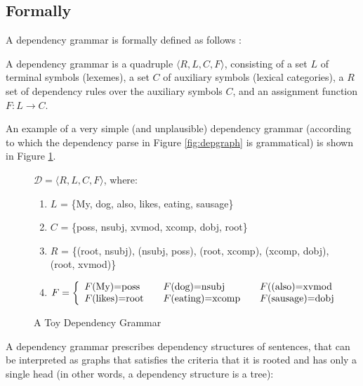 \documentclass{report}
\begin{document}
\subsection{Formally}

A dependency grammar is formally defined as follows \citep{hays1964dependency,gaifman1965dependency}:

\begin{definition}\label{def:depgram}
A dependency grammar is a quadruple $\langle R,L,C,F\rangle$, consisting of a set $L$ of terminal symbols (lexemes), a set $C$ of auxiliary symbols (lexical categories), a $R$ set of dependency rules over the auxiliary symbols $C$, and an assignment function $F : L\rightarrow C$.
\end{definition}

An example of a very simple (and unplausible) dependency grammar (according to which the dependency parse in Figure \ref{fig:depgraph} is grammatical) is shown in Figure \ref{fig:depgrammar}.

\begin{figure}[!ht]
\begin{framed}
$\mathcal{D} = \langle R,L,C,F\rangle$, where:\begin{enumerate}
\item[] $L$ = \{My, dog, also, likes, eating, sausage\}
\item[] $C$ = \{poss, nsubj, xvmod, xcomp, dobj, root\}
\item[] $R$ = \{(root, nsubj), (nsubj, poss), (root, xcomp), (xcomp, dobj), (root, xvmod)\}
\item[] $F = \left\{
  \begin{array}{l l l}
	F\text{(My)=poss} & \quad F\text{(dog)=nsubj} & \quad F(\text{(also)=xvmod}\\
	F\text{(likes)=root}& \quad F\text{(eating)=xcomp} & \quad F\text{(sausage)=dobj} 
  \end{array} \right.$
\end{enumerate}
\end{framed}
\caption{A Toy Dependency Grammar}\label{fig:depgrammar}
\end{figure}


\noindent A dependency grammar prescribes dependency structures of sentences, that can be interpreted as graphs that satisfies the criteria that it is rooted and has only a single head (in other words, a dependency structure is a tree):
\end{document}
